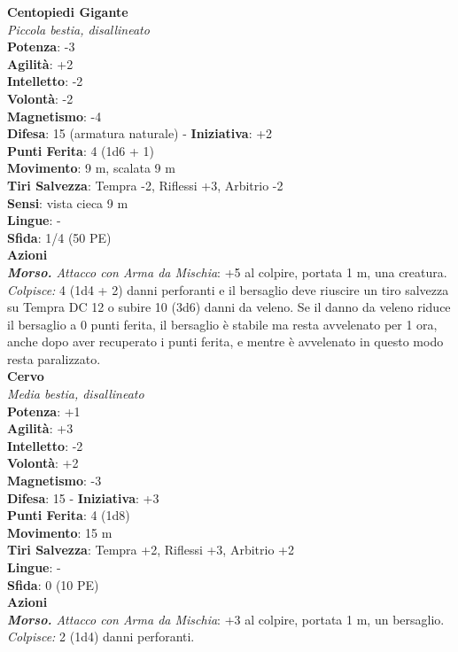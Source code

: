 \begin{multicols}{2}
\medskip\textbf{Centopiedi Gigante}\\
\emph{Piccola bestia, disallineato}\\
\textbf{Potenza}: -3\\
\textbf{Agilità}: +2\\
\textbf{Intelletto}: -2\\
\textbf{Volontà}: -2\\
\textbf{Magnetismo}: -4\\
\textbf{Difesa}: 15 (armatura naturale) - \textbf{Iniziativa}: +2\\
\textbf{Punti Ferita}: 4 (1d6 + 1)\\
\textbf{Movimento}: 9 m, scalata 9 m\\
\textbf{Tiri Salvezza}: Tempra -2, Riflessi +3, Arbitrio -2 \\
\textbf{Sensi}: vista cieca 9 m\\
\textbf{Lingue}: -\\
\textbf{Sfida}: 1/4 (50 PE)\smallskip\\
\smallskip\textbf{Azioni}\\
\emph{\textbf{Morso.} Attacco con Arma da Mischia}: +5 al colpire, portata 1 m, una creatura.\\
\emph{Colpisce:} 4 (1d4 + 2) danni perforanti e il bersaglio deve riuscire un tiro salvezza su Tempra DC  12 o subire 10 (3d6) danni da veleno. Se il danno da veleno riduce il bersaglio a 0 punti ferita, il bersaglio è stabile ma resta avvelenato per 1 ora, anche dopo aver recuperato i punti ferita, e mentre è avvelenato in questo modo resta paralizzato.\\

\medskip\textbf{Cervo}\\
\emph{Media bestia, disallineato}\\
\textbf{Potenza}: +1\\
\textbf{Agilità}: +3\\
\textbf{Intelletto}: -2\\
\textbf{Volontà}: +2\\
\textbf{Magnetismo}: -3\\
\textbf{Difesa}: 15 - \textbf{Iniziativa}: +3\\
\textbf{Punti Ferita}: 4 (1d8)\\
\textbf{Movimento}: 15 m\\
\textbf{Tiri Salvezza}: Tempra +2, Riflessi +3, Arbitrio +2 \\
\textbf{Lingue}: -\\
\textbf{Sfida}: 0 (10 PE)\smallskip\\
\smallskip\textbf{Azioni}\\
\emph{\textbf{Morso.} Attacco con Arma da Mischia}: +3 al colpire, portata 1 m, un bersaglio.\\
\emph{Colpisce:} 2 (1d4) danni perforanti.\\


\end{multicols}

